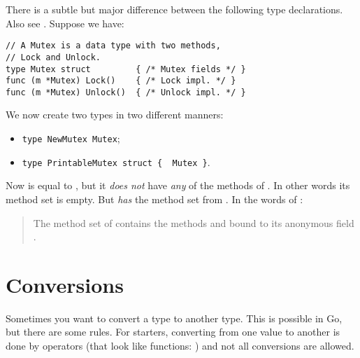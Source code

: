 There is a subtle but major difference between the following type
declarations. Also see \cite[section~``Type Declarations'']{go_spec}.
Suppose we have:
\begin{lstlisting}
// A Mutex is a data type with two methods,
// Lock and Unlock.
type Mutex struct         { /* Mutex fields */ }
func (m *Mutex) Lock()    { /* Lock impl. */ }
func (m *Mutex) Unlock()  { /* Unlock impl. */ }
\end{lstlisting}
We now create two types in two different manners:
\begin{itemize}
\item \lstinline|type NewMutex Mutex|;
\item \lstinline|type PrintableMutex struct {  Mutex }|.
\end{itemize}
Now  is equal to , but
it \emph{does not} have \emph{any} of the methods of . In other words
its method set is empty.
But  \emph{has}  the 
method set from .
In the words of \cite{go_spec}:
\begin{quote}
The method set of  contains the methods
 and  bound to its anonymous field .
\end{quote}

\section{Conversions}
\label{sec:conversions}
Sometimes you want to convert a type to another type. 
This is possible in Go, but
there are some rules. For starters, converting from one value to another
is done by operators (that look like functions: ) and not all conversions are allowed.

\begin{table}[H]
\begin{center}
\caption[Valid conversions]{Valid conversions,
\lstinline{float64} works the same as \lstinline{float32}. Note that
float32 has been abbreviated to flt32 in this table to make it fit on the page.}
\label{tab:convesion}

\end{center}
\end{table}

